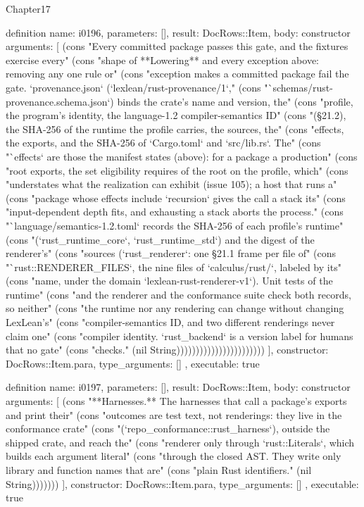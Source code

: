 \begin{lexlean}{Chapter17}
\begin{semanticmodule}
definition{
  name: i0196,
  parameters: [],
  result: DocRows::Item,
  body: constructor{
    arguments: [
      (cons "Every committed package passes this gate, and the fixtures exercise every" (cons "shape of **Lowering** and every exception above: removing any one rule or" (cons "exception makes a committed package fail the gate. `provenance.json` (`lexlean/rust-provenance/1`," (cons "`schemas/rust-provenance.schema.json`) binds the crate's name and version, the" (cons "profile, the program's identity, the language-1.2 compiler-semantics ID" (cons "(§21.2), the SHA-256 of the runtime the profile carries, the sources, the" (cons "effects, the exports, and the SHA-256 of `Cargo.toml` and `src/lib.rs`. The" (cons "`effects` are those the manifest states (above): for a package a production" (cons "root exports, the set eligibility requires of the root on the profile, which" (cons "understates what the realization can exhibit (issue 105); a host that runs a" (cons "package whose effects include `recursion` gives the call a stack its" (cons "input-dependent depth fits, and exhausting a stack aborts the process." (cons "`language/semantics-1.2.toml` records the SHA-256 of each profile's runtime" (cons "(`rust_runtime_core`, `rust_runtime_std`) and the digest of the renderer's" (cons "sources (`rust_renderer`: one §21.1 frame per file of" (cons "`rust::RENDERER_FILES`, the nine files of `calculus/rust/`, labeled by its" (cons "name, under the domain `lexlean-rust-renderer-v1`). Unit tests of the runtime" (cons "and the renderer and the conformance suite check both records, so neither" (cons "the runtime nor any rendering can change without changing LexLean's" (cons "compiler-semantics ID, and two different renderings never claim one" (cons "compiler identity. `rust_backend` is a version label for humans that no gate" (cons "checks." (nil String)))))))))))))))))))))))
    ],
    constructor: DocRows::Item.para,
    type_arguments: []
  },
  executable: true
}

definition{
  name: i0197,
  parameters: [],
  result: DocRows::Item,
  body: constructor{
    arguments: [
      (cons "**Harnesses.** The harnesses that call a package's exports and print their" (cons "outcomes are test text, not renderings: they live in the conformance crate" (cons "(`repo_conformance::rust_harness`), outside the shipped crate, and reach the" (cons "renderer only through `rust::Literals`, which builds each argument literal" (cons "through the closed AST. They write only library and function names that are" (cons "plain Rust identifiers." (nil String)))))))
    ],
    constructor: DocRows::Item.para,
    type_arguments: []
  },
  executable: true
}


\end{semanticmodule}
\end{lexlean}

